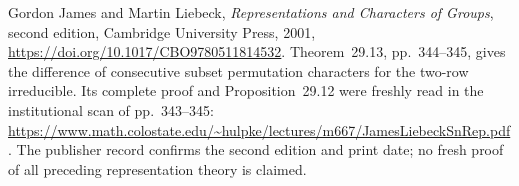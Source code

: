Gordon James and Martin Liebeck,
\emph{Representations and Characters of Groups}, second edition,
Cambridge University Press, 2001,
\url{https://doi.org/10.1017/CBO9780511814532}.
Theorem~29.13, pp.~344--345, gives the difference of consecutive
subset permutation characters for the two-row irreducible.
Its complete proof and Proposition~29.12 were freshly read in
the institutional scan of pp.~343--345:
\url{https://www.math.colostate.edu/~hulpke/lectures/m667/JamesLiebeckSnRep.pdf}.
The publisher record confirms the second edition and print date;
no fresh proof of all preceding representation theory is claimed.
